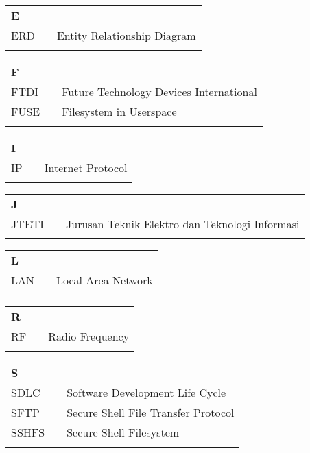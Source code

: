\documentclass{jtetiskripsi}
\begin{document}
\begin{tabular}{p{20pt}p{3pt}l}
\textbf{E}\\
ERD & & Entity Relationship Diagram\\
\\
\end{tabular}

\begin{tabular}{p{20pt}p{3pt}l}
\textbf{F}\\
FTDI & & Future Technology Devices International\\
FUSE & & Filesystem in Userspace\\
\\
\end{tabular}

\begin{tabular}{p{20pt}p{3pt}l}
\textbf{I}\\
IP & & Internet Protocol\\
\\
\end{tabular}

\begin{tabular}{p{20pt}p{3pt}l}
\textbf{J}\\
JTETI & & Jurusan Teknik Elektro dan Teknologi Informasi\\
\\
\end{tabular}

\begin{tabular}{p{20pt}p{3pt}l}
\textbf{L}\\
LAN & & Local Area Network\\
\\
\end{tabular}

\begin{tabular}{p{20pt}p{3pt}l}
\textbf{R}\\
RF & & Radio Frequency\\
\\
\end{tabular}

\begin{tabular}{p{20pt}p{3pt}l}
\textbf{S}\\
SDLC & & Software Development Life Cycle\\
SFTP & & Secure Shell File Transfer Protocol\\
SSHFS & & Secure Shell Filesystem\\
\\
\end{tabular}
\end{document}
